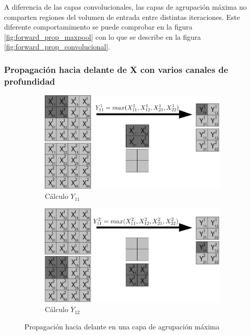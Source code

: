 A diferencia de las capas convolucionales, las capas de agrupación máxima no comparten regiones del volumen de entrada entre distintas iteraciones. Este diferente comportamimento se puede comprobar en la figura \ref{fig:forward_prop_maxpool} con lo que se describe en la figura \ref{fig:forward_prop_convolucional}.


\subsubsection{Propagación hacia delante de X con varios canales de profundidad}

\begin{figure}[H]
	\centering
	\begin{subfigure}{.5\textwidth}
		\hspace{-10mm}
		\includegraphics[width=1.2\linewidth]{imagenes/maxpool_2capas_1.jpg}  
		\caption{Cálculo $Y_{11}$}
	\end{subfigure}%
	\begin{subfigure}{.5\textwidth}
		\hspace{10mm}
		\includegraphics[width=1.2\linewidth]{imagenes/maxpool_2capas_2.jpg}  
		\caption{Cálculo $Y_{12}$}
	\end{subfigure}
	
	\caption{Propagación hacia delante en una capa de agrupación máxima}
	\label{fig:forward_prop_maxpool_canales_profundidad}
\end{figure}

